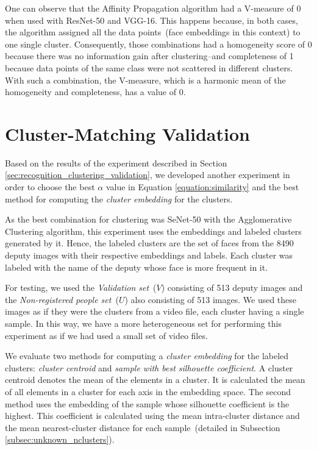 One can observe that the Affinity Propagation algorithm had a V-measure of $0$ when used with ResNet-50 and VGG-16. 
This happens because, in both cases, the algorithm assigned all the data points~(face embeddings in this context) to one single cluster. 
Consequently, those combinations had a homogeneity score of $0$ because there was no information gain after clustering--and completeness of 1 because data points of the same class were not scattered in different clusters.
With such a combination, the V-measure, which is a harmonic mean of the homogeneity and completeness, has a value of $0$.


\section{Cluster-Matching Validation}
\label{sec:recognition_matching_validation}

Based on the results of the experiment described in Section \ref{sec:recognition_clustering_validation}, we developed another experiment in order to choose the best $\alpha$ value in Equation \ref{equation:similarity} and the best method for computing the \emph{cluster embedding} for the clusters.

As the best combination for clustering was SeNet-50 with the Agglomerative Clustering algorithm, this experiment uses the embeddings and labeled clusters generated by it.
Hence, the labeled clusters are the set of faces from the 8490 deputy images with their respective embeddings and labels.
Each cluster was labeled with the name of the deputy whose face is more frequent in it.

For testing, we used the \emph{Validation set}~($V$) consisting of 513 deputy images and the \emph{Non-registered people set}~($U$) also consisting of 513 images.
We used these images as if they were the clusters from a video file, each cluster having a single sample.
In this way, we have a more heterogeneous set for performing this experiment as if we had used a small set of video files.

We evaluate two methods for computing a \emph{cluster embedding} for the labeled clusters: \emph{cluster centroid} and \emph{sample with best silhouette coefficient}. A cluster centroid denotes the mean of the elements in a cluster.
It is calculated the mean of all elements in a cluster for each axis in the embedding space. The second method uses the embedding of the sample whose silhouette coefficient is the highest.
This coefficient is calculated using the mean intra-cluster distance and the mean nearest-cluster distance for each sample~(detailed in Subsection \ref{subsec:unknown_nclusters}).

